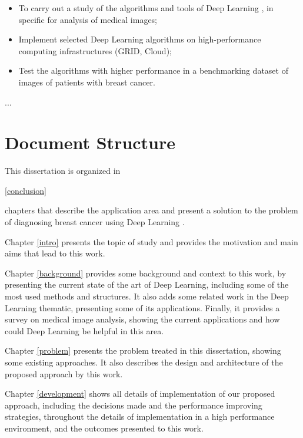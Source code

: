 \documentclass[
  twoside,
  11pt, a4paper,
  footinclude=true,
  headinclude=true,
  cleardoublepage=empty
]{scrbook}
\begin{document}
      \begin{itemize}
        \item To carry out a study of the algorithms and tools of Deep Learning , in specific for analysis of medical images;
        \item Implement selected Deep Learning algorithms on high-performance computing infrastructures (GRID, Cloud);
        \item Test the algorithms with higher performance in a benchmarking dataset of images of patients with breast cancer.
      \end{itemize}

      ...

    \section{Document Structure} \label{intro:organization}
      This dissertation is organized in \begin{NoHyper}\ref{conclusion}\end{NoHyper} chapters that describe the application area and present a solution to the problem of diagnosing breast cancer using Deep Learning .

      Chapter \ref{intro} presents the topic of study and provides the motivation and main aims that lead to this work.

      Chapter \ref{background} provides some background and context to this work, by presenting the current state of the art of Deep Learning, including some of the most used methods and structures. It also adds some related work in the Deep Learning thematic, presenting some of its applications. Finally, it provides a survey on medical image analysis, showing the current applications and how could Deep Learning be helpful in this area.

      Chapter \ref{problem} presents the problem treated in this dissertation, showing some existing approaches. It also describes the design and architecture of the proposed approach by this work.

      Chapter \ref{development} shows all details of implementation of our proposed approach, including the decisions made and the performance improving strategies, throughout the details of implementation in a high performance environment, and the outcomes presented to this work.
\end{document}
